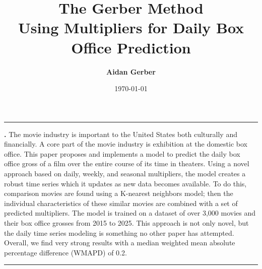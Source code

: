\documentclass[12pt]{article}
\renewenvironment{quote}
    {\small\list{}{\rightmargin=.5cm \leftmargin=.5cm}%
    \item\relax}
    {\endlist}
\renewenvironment{abstract} 
    {\begin{quote}
    \noindent \rule{\linewidth}{.5pt}\par{\bfseries \abstractname.}}
    {\newline\medskip\noindent \rule{\linewidth}{.5pt}
    \end{quote}
    }
\begin{document}

\title{\textbf{The Gerber Method} \\[6pt] \large Using Multipliers for Daily Box Office Prediction}

\author{\textbf{Aidan Gerber}}

\date{\today}  %

\maketitle
\thispagestyle{empty}


\begin{abstract}
The movie industry is important to the United States both culturally and financially. A core part of the movie industry is exhibition at the domestic box office. 
This paper proposes and implements a model to predict the daily box office gross of a film over the entire course of its time in theaters. 
Using a novel approach based on daily, weekly, and seasonal multipliers, the model creates a robust time series which it updates as new data becomes available. To do this, comparison movies are found using a K-nearest neighbors model; then the individual characteristics of these similar movies are combined with a set of predicted multipliers.
The model is trained on a dataset of over 3,000 movies and their box office grosses from 2015 to 2025. 
This approach is not only novel, but the daily time series modeling is something no other paper has attempted.
Overall, we find very strong results with a median weighted mean absolute percentage difference (WMAPD) of 0.2.
\end{abstract}

\newpage


\end{document}
